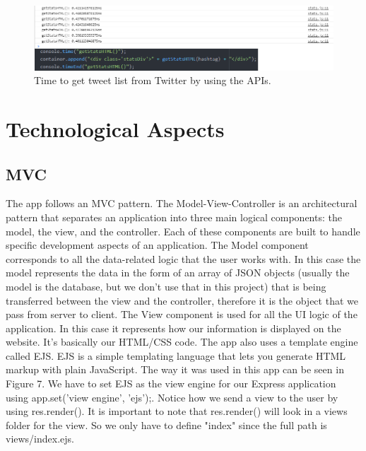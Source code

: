 \documentclass[12pt]{article} %
\begin{document}
\begin{figure}[H] %
\includegraphics[width=1\linewidth]{images/getStatsHTMLTime}
\caption{Time to get tweet list from Twitter by using the APIs.}
\label{getStatsHTMLTime}
\end{figure}



\section{Technological Aspects} 

\subsection{MVC}
\noindent The app follows an MVC pattern. The Model-View-Controller is an architectural pattern that separates an 
application into three main logical components: the model, the view, and the controller.
 Each of these components are built to handle specific development aspects of an application.
\newline
The Model component corresponds to all the data-related logic that the user works with. In this case the model represents
the data in the form of an array of JSON objects (usually the model is the database, but we don't use that in this project) 
that is being transferred between the view and the controller, therefore it is the object that we pass
from server to client. 
\newline
The View component is used for all the UI logic of the application. In this case it represents how our information
is displayed on the website. It's basically our HTML/CSS code.
The app also uses a template engine called EJS. EJS is a simple templating language that lets you generate HTML markup with plain JavaScript.
The way it was used in this app can be seen in Figure 7.
We have to set EJS as the view engine for our Express application using app.set('view engine', 'ejs');.
Notice how we send a view to the user by using res.render(). It is important to note that res.render() will look in a views folder for the view. 
So we only have to define "index"  since the full path is views/index.ejs.
\end{document}
